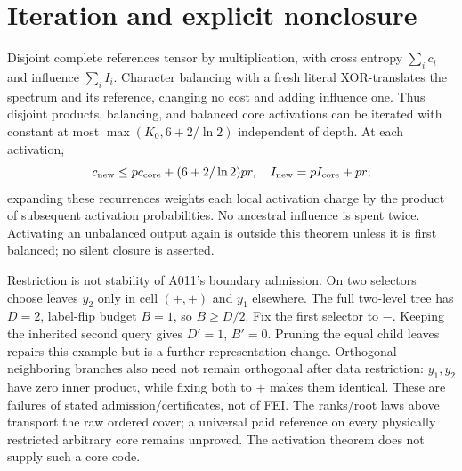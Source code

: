 \documentclass{article}
\begin{document}
\section{Iteration and explicit nonclosure}
Disjoint complete references tensor by multiplication, with cross entropy
$\sum_i c_i$ and influence $\sum_iI_i$. Character balancing with a fresh
literal XOR-translates the spectrum and its reference, changing no cost
and adding influence one. Thus disjoint products, balancing, and balanced
core activations can be iterated with constant at most
$\max(K_0,6+2/\ln2)$ independent of depth. At each activation,
\[
 c_{\rm new}\le p c_{\rm core}+(6+2/\ln2)pr,
\quad I_{\rm new}=pI_{\rm core}+pr;
\]
expanding these recurrences weights each local activation charge by the
product of subsequent activation probabilities. No ancestral influence
is spent twice. Activating an unbalanced output again is outside this
theorem unless it is first balanced; no silent closure is asserted.

Restriction is not stability of A011's boundary admission. On two
selectors choose leaves $y_2$ only in cell $(+,+)$ and $y_1$ elsewhere.
The full two-level tree has $D=2$, label-flip budget $B=1$, so $B\ge D/2$.
Fix the first selector to $-$. Keeping the inherited second query gives
$D'=1$, $B'=0$. Pruning the equal child leaves repairs this example but
is a further representation change. Orthogonal neighboring branches
also need not remain orthogonal after data restriction: $y_1,y_2$ have
zero inner product, while fixing both to $+$ makes them identical.
These are failures of stated admission/certificates, not of FEI.
The ranks/root laws above transport the raw ordered cover; a universal
paid reference on every physically restricted arbitrary core remains
unproved. The activation theorem does not supply such a core code.
\end{document}

